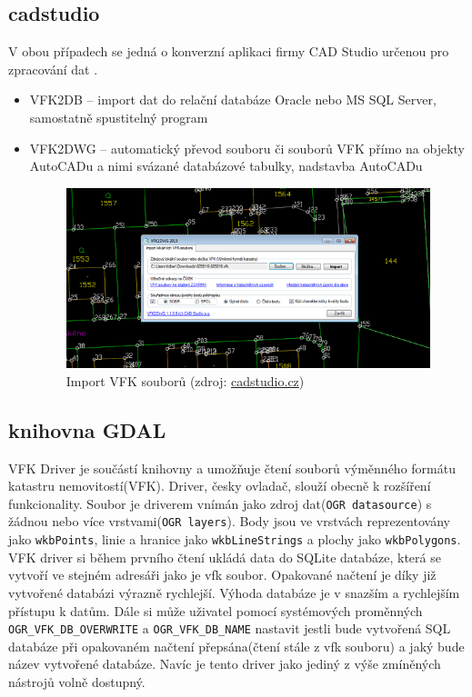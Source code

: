 \subsection{cadstudio}
V obou případech se jedná o konverzní aplikaci firmy CAD Studio určenou pro zpracování dat .
\begin{itemize}[leftmargin=50pt]
\item VFK2DB -- import dat do relační databáze Oracle nebo MS SQL Server, samostatně spustitelný program \cite{vfk2db} %
\item VFK2DWG -- automatický převod souboru či souborů VFK přímo na objekty AutoCADu a nimi svázané databázové tabulky, nadstavba AutoCADu \cite{vfk2dwg}

\begin{figure}[H]
	 \centering
      \includegraphics[width=14cm]{./pictures/vfk2dwg.png}
      \caption{Import VFK souborů (zdroj:
\href{http://www.cadstudio.cz/img/vfk2dwg11.gif}{cadstudio.cz})}
      \label{fig:cadstudio}
  \end{figure}
\end{itemize}
\subsection{knihovna GDAL}
\label{subsec:gdal_vfk}
VFK Driver je součástí knihovny  a umožňuje čtení souborů výměnného formátu katastru nemovitostí(VFK). Driver, česky ovladač, slouží obecně k rozšíření funkcionality. Soubor  je driverem vnímán jako zdroj dat(\verb|OGR datasource|) s žádnou nebo více vrstvami(\verb|OGR layers|). Body jsou ve vrstvách reprezentovány jako \verb|wkbPoints|, linie a hranice jako \verb|wkbLineStrings| a plochy jako \verb|wkbPolygons|. VFK driver si během prvního čtení ukládá data do SQLite databáze, která se vytvoří ve stejném adresáři jako je vfk soubor. Opakované načtení je díky již vytvořené databázi výrazně rychlejší. Výhoda databáze je v snazším a rychlejším přístupu k datům. Dále si může uživatel pomocí systémových proměnných \verb|OGR_VFK_DB_OVERWRITE| a \verb|OGR_VFK_DB_NAME| nastavit jestli bude vytvořená SQL databáze při opakovaném načtení přepsána(čtení stále z vfk souboru) a jaký bude název vytvořené databáze. Navíc je tento driver jako jediný z výše zmíněných nástrojů volně dostupný. \cite{vfk_driver}

